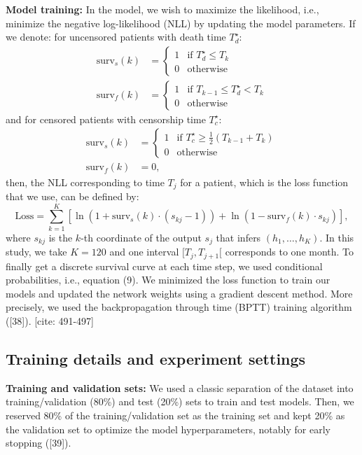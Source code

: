 \documentclass[a4paper,10pt]{article}
\begin{document}
\textbf{Model training:} In the model, we wish to maximize the likelihood, i.e., minimize the negative log-likelihood (NLL) by updating the model parameters. If we denote:
for uncensored patients with death time $T^\star_d$:
\begin{align}
\text{surv}_s(k) &= \begin{cases} 1 & \text{if } T^\star_d \le T_k \\ 0 & \text{otherwise} \end{cases} \\
\text{surv}_f(k) &= \begin{cases} 1 & \text{if } T_{k-1} \le T^\star_d < T_k \\ 0 & \text{otherwise} \end{cases}
\end{align}
and for censored patients with censorship time $T^\star_c$:
\begin{align}
\text{surv}_s(k) &= \begin{cases} 1 & \text{if } T^\star_c \ge \frac{1}{2}(T_{k-1} + T_k) \\ 0 & \text{otherwise} \end{cases} \\
\text{surv}_f(k) &= 0,
\end{align}
then, the NLL corresponding to time $T_j$ for a patient, which is the loss function that we use, can be defined by:
\begin{equation}
\text{Loss} = \sum_{k=1}^{K} \left[ \ln(1 + \text{surv}_s(k) \cdot (s_{kj} - 1)) + \ln(1 - \text{surv}_f(k) \cdot s_{kj}) \right],
\end{equation}
where $s_{kj}$ is the $k$-th coordinate of the output $s_j$ that infers $(h_1, \dots, h_K)$. In this study, we take $K = 120$ and one interval $[T_j, T_{j+1}[$ corresponds to one month. To finally get a discrete survival curve at each time step, we used conditional probabilities, i.e., equation (9). We minimized the loss function to train our models and updated the network weights using a gradient descent method. More precisely, we used the backpropagation through time (BPTT) training algorithm ([38]). [cite: 491-497]

\subsection{Training details and experiment settings}
\textbf{Training and validation sets:} We used a classic separation of the dataset into training/validation (80\%) and test (20\%) sets to train and test models. Then, we reserved 80\% of the training/validation set as the training set and kept 20\% as the validation set to optimize the model hyperparameters, notably for early stopping ([39]).
\end{document}
